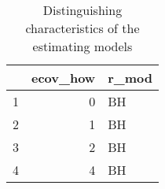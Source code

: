 \begin{table}[ht]
\centering
\caption{Distinguishing characteristics of the estimating models}
\begin{tabular}{rrl}
  \hline
 & ecov\_how & r\_mod \\ 
  \hline
1 & 0 & BH \\ 
  2 & 1 & BH \\ 
  3 & 2 & BH \\ 
  4 & 4 & BH \\ 
   \hline
\end{tabular}
\end{table}
